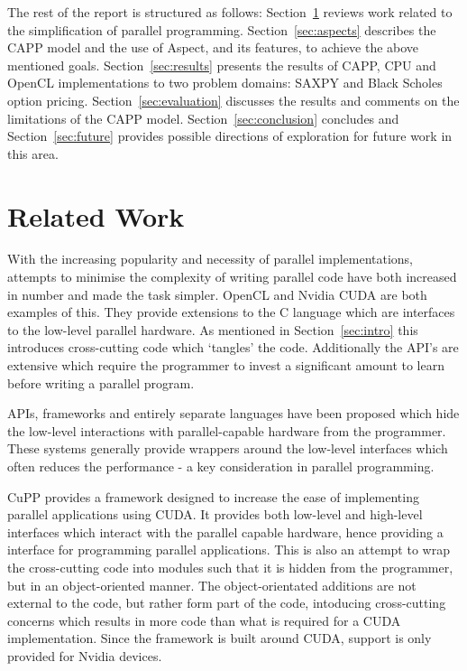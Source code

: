 \documentclass{sig-alternate-05-2015}
\begin{document}
The rest of the report is structured as follows: Section~\ref{sec:related}
reviews work related to the simplification of parallel programming.
Section~\ref{sec:aspects} describes the CAPP model and the use 
of Aspect\CPP, and its features, to achieve the above mentioned goals. Section~\ref{sec:results}
presents the results of CAPP, CPU and OpenCL implementations to two
problem domains:
SAXPY and Black Scholes option pricing.
Section~\ref{sec:evaluation} discusses the results and comments on the limitations 
of the CAPP model.
Section~\ref{sec:conclusion} concludes and Section~\ref{sec:future}
provides possible directions of exploration for future work in this area.

\section{Related Work}\label{sec:related}

With the increasing popularity and necessity of parallel implementations,
attempts to minimise the complexity of writing parallel code have both increased
in number and made the task simpler. OpenCL and Nvidia CUDA are both examples of
this. They provide extensions to the C language which are interfaces to the low-level
parallel hardware. As mentioned in Section~\ref{sec:intro} this
introduces cross-cutting code which `tangles' the \CPP code. Additionally the API's 
are extensive which require the programmer to invest a significant amount to
learn before writing a parallel program.

APIs, frameworks and entirely separate languages have been proposed which hide the low-level 
interactions with  parallel-capable hardware from the programmer.
These systems generally provide wrappers around the low-level interfaces 
which often reduces the performance - a key consideration in parallel
programming.

CuPP \cite{breit:cupp} provides a \CPP framework designed to increase the ease of implementing parallel
applications using CUDA. It provides both low-level and high-level interfaces
which interact with the parallel capable hardware, hence providing a \CPP
interface for programming parallel applications. This is also an attempt to wrap
the cross-cutting code into modules such that it is hidden from  the programmer,
but in an object-oriented manner. The object-orientated additions are not
external to the \CPP code, but rather form part of the \CPP code, intoducing
cross-cutting concerns which results in more code than what is required for a 
CUDA implementation. Since the framework is built around CUDA, support is only provided 
for Nvidia devices.
\end{document}
